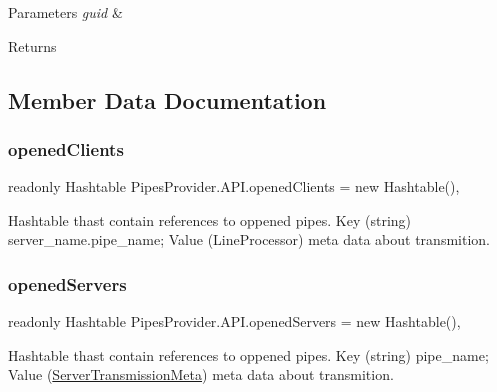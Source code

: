 \begin{DoxyParams}{Parameters}
{\em guid} & \\
\hline
\end{DoxyParams}
\begin{DoxyReturn}{Returns}

\end{DoxyReturn}


\subsection{Member Data Documentation}
\mbox{\label{class_pipes_provider_1_1_a_p_i_a8efe588e9c6f7bf610310d9f6223a0f8}} 
\subsubsection{\texorpdfstring{opened\+Clients}{openedClients}}
{\footnotesize\ttfamily readonly Hashtable Pipes\+Provider.\+A\+P\+I.\+opened\+Clients = new Hashtable()\hspace{0.3cm}{\ttfamily [static]}, {\ttfamily [private]}}



Hashtable thast contain references to oppened pipes. Key (string) server\+\_\+name.\+pipe\+\_\+name; Value (Line\+Processor) meta data about transmition. 

\mbox{\label{class_pipes_provider_1_1_a_p_i_ae5d6ee8740cc704d7ac5fc619349b603}} 
\subsubsection{\texorpdfstring{opened\+Servers}{openedServers}}
{\footnotesize\ttfamily readonly Hashtable Pipes\+Provider.\+A\+P\+I.\+opened\+Servers = new Hashtable()\hspace{0.3cm}{\ttfamily [static]}, {\ttfamily [private]}}



Hashtable thast contain references to oppened pipes. Key (string) pipe\+\_\+name; Value (\mbox{\hyperlink{class_pipes_provider_1_1_server_transmission_meta}{Server\+Transmission\+Meta}}) meta data about transmition. 



